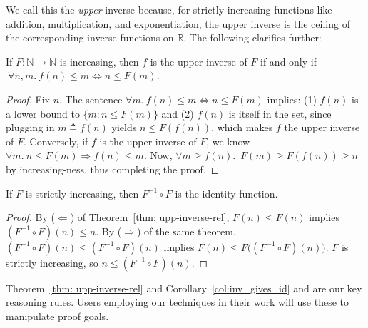 We call this the \emph{upper} inverse because, for strictly increasing functions like
addition, multiplication, and exponentiation, the upper inverse is the ceiling of the 
corresponding inverse functions on $\mathbb{R}$. The following clarifies further:
\begin{thm} \label{thm: upp-inverse-rel}
	If $F:\mathbb{N}\to \mathbb{N}$ is increasing, then $f$ is the upper inverse of $F$ if and only if $\ \forall n, m.~ f(n)\le m \iff n \le F(m)$.
\end{thm}
\begin{proof}
Fix $n$. The sentence $\forall m.~ f(n)\le m \iff n\le F(m)$ implies: (1) $f(n)$ is a lower bound to $\{m: n \le F(m)\}$ and (2) $f(n)$ is itself in the set, since plugging in $m \triangleq f(n)$ yields $n\le F(f(n))$, which makes $f$ the upper inverse of $F$. Conversely, if $f$ is the upper inverse of $F$, we know $\forall m.~n\le F(m)\Rightarrow f(n)\le m$. Now, $\forall m \ge f(n)$.~$F(m)\ge F(f(n)) \ge n$ by increasing-ness, thus completing the proof.
\end{proof}
\begin{col}\label{col:inv_gives_id}
If $F$ is strictly increasing, then $F^{-1} \circ F$ is
the identity function.
\end{col}
\begin{proof}
By ($\Leftarrow$) of Theorem~\ref{thm: upp-inverse-rel}, $F(n) \le F(n)$ implies 
$(F^{-1} \circ F)(n) \le n$.  By ($\Rightarrow$) of the same theorem, $(F^{-1} \circ F)(n) \le (F^{-1} \circ F)(n)$ implies $F(n) \le F \big((F^{-1} \circ F)(n)\big)$. $F$ is strictly increasing, so $n \le (F^{-1} \circ F)(n)$.
\end{proof}

\begin{rem}
Theorem~\ref{thm: upp-inverse-rel} and Corollary~\ref{col:inv_gives_id} 
and are our key reasoning rules. Users employing our techniques 
in their work will use these to manipulate proof goals.
\end{rem}

